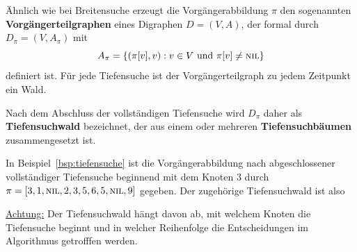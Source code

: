 \begin{defn} 
Ähnlich wie bei Breitensuche erzeugt die Vorgängerabbildung $\pi$ den sogenannten \textbf{Vor\-gänger\-teil\-graphen} eines Digraphen $D=(V,A)$, der formal durch $D_\pi=(V,A_\pi)$ mit
\[
A_\pi = \left\{(\pi[v],v) : v \in V \text{ und } \pi[v] \neq \mathop{\text{\textsc{nil}}}\right\}
\]
definiert ist.
Für jede Tiefensuche ist der Vorgängerteilgraph zu jedem Zeitpunkt ein Wald.

Nach dem Abschluss der vollständigen Tiefensuche wird $D_\pi$ daher als \textbf{Tiefensuchwald} bezeichnet, der aus einem oder mehreren \textbf{Tiefensuchbäumen} zusammengesetzt ist.
\end{defn} 

\begin{bsp} 
In Beispiel~\ref{bsp:tiefensuche} ist die Vorgängerabbildung nach abgeschlossener vollständiger Tiefensuche beginnend mit dem Knoten $3$ durch $\pi=[3,1,\mathop{\text{\textsc{nil}}},2,3,5,6,5,\mathop{\text{\textsc{nil}}},9]$ gegeben.
Der zugehörige Tiefensuchwald ist also

\begin{center} 
\end{center}

\noindent\underline{Achtung:} Der Tiefensuchwald hängt davon ab, mit welchem Knoten die Tiefensuche beginnt und in welcher Reihenfolge die Entscheidungen im Algorithmus getrofffen werden.
\end{bsp} 

